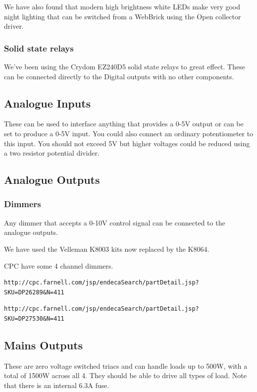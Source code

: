 		We have also found that modern high brightness white LEDs make very good night lighting that can be switched from
		a WebBrick using the Open collector driver.

	\subsubsection{Solid state relays}

	We've been using the Crydom EZ240D5 solid state relays to great effect.  These can be connected directly to 
	the Digital outputs with no other components.

	\subsection{Analogue Inputs}

		These can be used to interface anything that provides a 0-5V output or can be set to produce a 0-5V input. 
		You could also connect an ordinary potentiometer to this input. You should not exceed 5V but higher voltages 
		could be reduced using a two resistor potential divider.

	\subsection{Analogue Outputs}

	\subsubsection{Dimmers}

	Any dimmer that accepts a 0-10V control signal can be connected to the analogue outputs.

	We have used the Velleman K8003 kits now replaced by the K8064.

	CPC have some 4 channel dimmers.
	\begin{verbatim}http://cpc.farnell.com/jsp/endecaSearch/partDetail.jsp?SKU=DP26289&N=411\end{verbatim}
	\begin{verbatim}http://cpc.farnell.com/jsp/endecaSearch/partDetail.jsp?SKU=DP27530&N=411\end{verbatim}

	\subsection{Mains Outputs}

		These are zero voltage switched triacs and can handle loads up to 500W, with a total of 1500W across all 4. 
		They should be able to drive all types of load. Note that there is an internal 6.3A fuse. 

